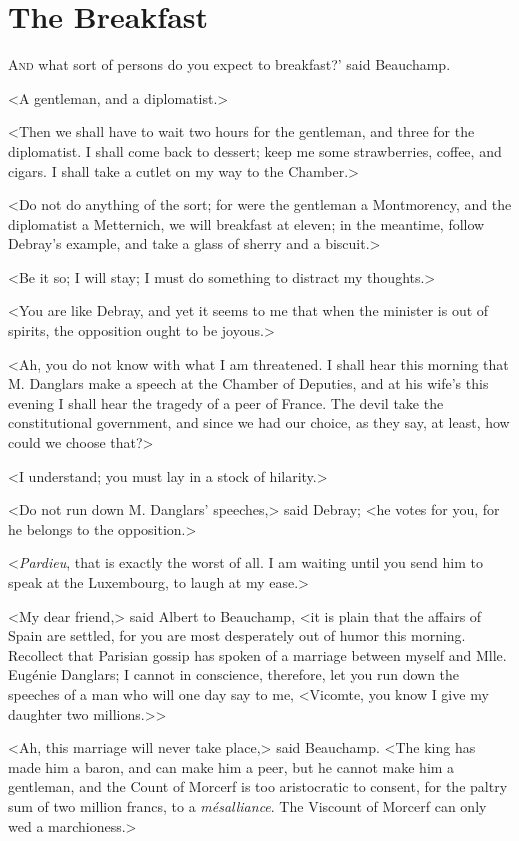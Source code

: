\chapter{The Breakfast} 

 \lettrine[ante=']{A}{nd} what sort of persons do you expect to breakfast?' said Beauchamp. 

\zz
 <A gentleman, and a diplomatist.> 

\zz
 <Then we shall have to wait two hours for the gentleman, and three for the diplomatist. I shall come back to dessert; keep me some strawberries, coffee, and cigars. I shall take a cutlet on my way to the Chamber.> 

 <Do not do anything of the sort; for were the gentleman a Montmorency, and the diplomatist a Metternich, we will breakfast at eleven; in the meantime, follow Debray's example, and take a glass of sherry and a biscuit.> 

 <Be it so; I will stay; I must do something to distract my thoughts.> 

 <You are like Debray, and yet it seems to me that when the minister is out of spirits, the opposition ought to be joyous.> 

 <Ah, you do not know with what I am threatened. I shall hear this morning that M. Danglars make a speech at the Chamber of Deputies, and at his wife's this evening I shall hear the tragedy of a peer of France. The devil take the constitutional government, and since we had our choice, as they say, at least, how could we choose that?> 

 <I understand; you must lay in a stock of hilarity.> 

 <Do not run down M. Danglars' speeches,> said Debray; <he votes for you, for he belongs to the opposition.> 

 <\textit{Pardieu}, that is exactly the worst of all. I am waiting until you send him to speak at the Luxembourg, to laugh at my ease.> 

 <My dear friend,> said Albert to Beauchamp, <it is plain that the affairs of Spain are settled, for you are most desperately out of humor this morning. Recollect that Parisian gossip has spoken of a marriage between myself and Mlle. Eugénie Danglars; I cannot in conscience, therefore, let you run down the speeches of a man who will one day say to me, <Vicomte, you know I give my daughter two millions.>> 

 <Ah, this marriage will never take place,> said Beauchamp. <The king has made him a baron, and can make him a peer, but he cannot make him a gentleman, and the Count of Morcerf is too aristocratic to consent, for the paltry sum of two million francs, to a \textit{mésalliance}. The Viscount of Morcerf can only wed a marchioness.> 

